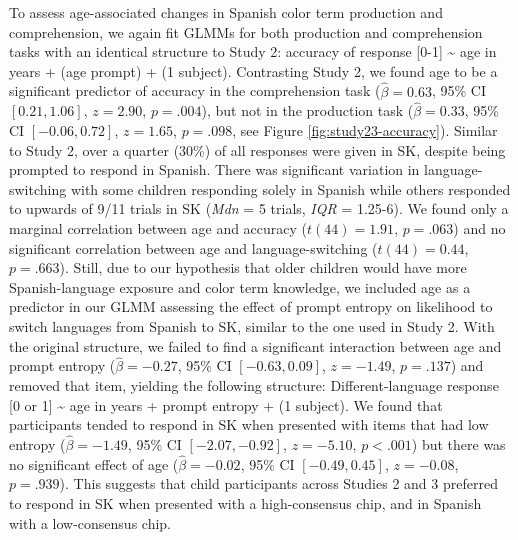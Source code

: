 \documentclass[
  english,
  ,man,floatsintext]{apa6}
\begin{document}
To assess age-associated changes in Spanish color term production and comprehension, we again fit GLMMs for both production and comprehension tasks with an identical structure to Study 2: accuracy of response {[}0-1{]} \textasciitilde{} age in years + (age \textbar{} prompt) + (1 \textbar{} subject). Contrasting Study 2, we found age to be a significant predictor of accuracy in the comprehension task (\(\hat{\beta} = 0.63\), 95\% CI \([0.21, 1.06]\), \(z = 2.90\), \(p = .004\)), but not in the production task (\(\hat{\beta} = 0.33\), 95\% CI \([-0.06, 0.72]\), \(z = 1.65\), \(p = .098\), see Figure \ref{fig:study23-accuracy}). Similar to Study 2, over a quarter (30\%) of all responses were given in SK, despite being prompted to respond in Spanish. There was significant variation in language-switching with some children responding solely in Spanish while others responded to upwards of 9/11 trials in SK (\emph{Mdn} = 5 trials, \emph{IQR} = 1.25-6). We found only a marginal correlation between age and accuracy (\(t(44) = 1.91\), \(p = .063\)) and no significant correlation between age and language-switching (\(t(44) = 0.44\), \(p = .663\)). Still, due to our hypothesis that older children would have more Spanish-language exposure and color term knowledge, we included age as a predictor in our GLMM assessing the effect of prompt entropy on likelihood to switch languages from Spanish to SK, similar to the one used in Study 2. With the original structure, we failed to find a significant interaction between age and prompt entropy (\(\hat{\beta} = -0.27\), 95\% CI \([-0.63, 0.09]\), \(z = -1.49\), \(p = .137\)) and removed that item, yielding the following structure: Different-language response {[}0 or 1{]} \textasciitilde{} age in years + prompt entropy + (1 \textbar{} subject). We found that participants tended to respond in SK when presented with items that had low entropy (\(\hat{\beta} = -1.49\), 95\% CI \([-2.07, -0.92]\), \(z = -5.10\), \(p < .001\)) but there was no significant effect of age (\(\hat{\beta} = -0.02\), 95\% CI \([-0.49, 0.45]\), \(z = -0.08\), \(p = .939\)). This suggests that child participants across Studies 2 and 3 preferred to respond in SK when presented with a high-consensus chip, and in Spanish with a low-consensus chip.
\end{document}

